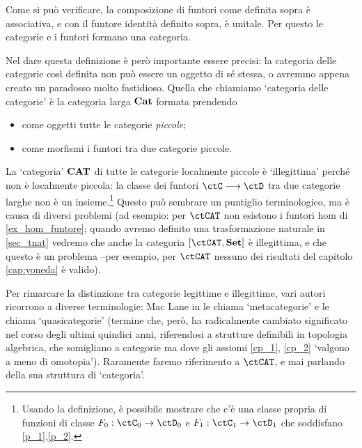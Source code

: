 \begin{definition}\label{ex_cat_cat}
	Come si può verificare, la composizione di funtori come definita sopra è associativa, e con il funtore identità definito sopra, è unitale. Per questo le categorie e i funtori formano una categoria.

	Nel dare questa definizione è però importante essere precisi: la categoria delle categorie così definita non può essere un oggetto di sé stessa, o avremmo appena creato un paradosso molto fastidioso. Quella che chiamiamo `categoria delle categorie' è la categoria larga \(\mathbf{Cat}\)  formata prendendo
	\begin{itemize}
		\item come oggetti tutte le categorie \emph{piccole};
		\item come morfismi i funtori tra due categorie piccole.
	\end{itemize}
\end{definition}
\begin{remark}
	La `categoria' \(\mathbf{CAT}\) di tutte le categorie localmente piccole è `illegittima' perché non è localmente piccola: la classe dei funtori \(\ctC \fun\ctD\) tra due categorie larghe non è un insieme.\footnote{Usando la definizione, è possibile mostrare che c'è una classe propria di funzioni di classe \(F_0 : \ctC_0 \to \ctD_0\) e \(F_1 : \ctC_1 \to \ctD_1\) che soddisfano \ref{p_1},\ref{p_2}.} Questo può sembrare un puntiglio terminologico, ma è causa di diversi problemi (ad esempio: per \(\ctCAT\) non esistono i funtori hom di \ref{ex_hom_funtore}; quando avremo definito una trasformazione naturale in \ref{sec_tnat} vedremo che anche la categoria \([\ctCAT,\ctSet]\) è illegittima, e che questo è un problema --per esempio, per \(\ctCAT\) nessuno dei risultati del capitolo \ref{cap:yoneda} è valido).

	Per rimarcare la distinzione tra categorie legittime e illegittime, vari autori ricorrono a diverse terminologie: Mac Lane in \cite{working-categories} le chiama `metacategorie' e \cite{acc} le chiama `quasicategorie' (termine che, però, ha radicalmente cambiato significato nel corso degli ultimi quindici anni, riferendosi a strutture definibili in topologia algebrica, che somigliano a categorie ma dove gli assiomi \ref{cp_1}, \ref{cp_2} `valgono a meno di omotopia'). Raramente faremo riferimento a \(\ctCAT\), e mai parlando della sua struttura di `categoria'.
\end{remark}
